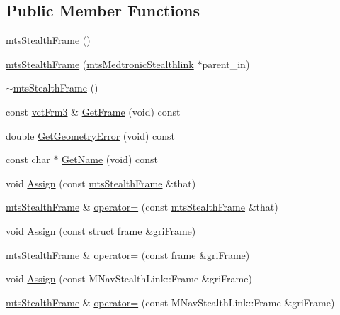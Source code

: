 \subsection*{Public Member Functions}
\begin{DoxyCompactItemize}
\item 
\hyperlink{classmts_stealth_frame_af32afe61af4982beef829344c6b96aea}{mts\+Stealth\+Frame} ()
\item 
\hyperlink{classmts_stealth_frame_a40a8a6d5bf9760a5ccc649012b98efc9}{mts\+Stealth\+Frame} (\hyperlink{classmts_medtronic_stealthlink}{mts\+Medtronic\+Stealthlink} $\ast$parent\+\_\+in)
\item 
\hyperlink{classmts_stealth_frame_a2ddd4401f06f843058dbfe2042dc2788}{$\sim$mts\+Stealth\+Frame} ()
\item 
const \hyperlink{vct_transformation_types_8h_a81feda0a02c2d1bc26e5553f409fed20}{vct\+Frm3} \& \hyperlink{classmts_stealth_frame_a9834fbe11a6dc5971a25d3a892620e89}{Get\+Frame} (void) const 
\item 
double \hyperlink{classmts_stealth_frame_a20ebeeaf561c90fb0be2924c02b230e3}{Get\+Geometry\+Error} (void) const 
\item 
const char $\ast$ \hyperlink{classmts_stealth_frame_ab2bdd6399b97c6558824f1feebdba73c}{Get\+Name} (void) const 
\item 
void \hyperlink{classmts_stealth_frame_a1c6b3490139cd399ae5c350cb97f8955}{Assign} (const \hyperlink{classmts_stealth_frame}{mts\+Stealth\+Frame} \&that)
\item 
\hyperlink{classmts_stealth_frame}{mts\+Stealth\+Frame} \& \hyperlink{classmts_stealth_frame_af158556b959ea14edbd87519613df304}{operator=} (const \hyperlink{classmts_stealth_frame}{mts\+Stealth\+Frame} \&that)
\item 
void \hyperlink{classmts_stealth_frame_af72faf583bebe3370e6bbc1436f57573}{Assign} (const struct frame \&gri\+Frame)
\item 
\hyperlink{classmts_stealth_frame}{mts\+Stealth\+Frame} \& \hyperlink{classmts_stealth_frame_a2c6000a1fa5bb27fae3a4f8c51a5312d}{operator=} (const frame \&gri\+Frame)
\item 
void \hyperlink{classmts_stealth_frame_af1699a73f8dfc4704d67edc43b994e7c}{Assign} (const M\+Nav\+Stealth\+Link\+::\+Frame \&gri\+Frame)
\item 
\hyperlink{classmts_stealth_frame}{mts\+Stealth\+Frame} \& \hyperlink{classmts_stealth_frame_aa96c149a0a583ec83a64142410f4c8c6}{operator=} (const M\+Nav\+Stealth\+Link\+::\+Frame \&gri\+Frame)
\item 

\end{DoxyCompactItemize}
